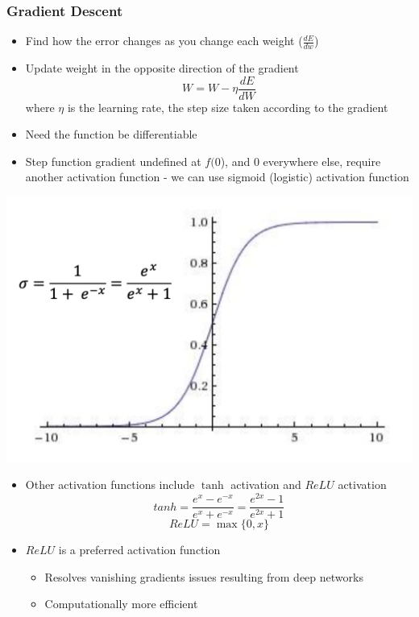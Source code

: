 \documentclass[11pt]{article}
\begin{document}
\subsubsection{Gradient Descent }
\begin{itemize}
\item Find how the error changes as you change each weight ($\frac{dE}{dw}$)
\item Update weight in the opposite direction of the gradient 
$$ W = W - \eta \frac{dE}{dW}$$ 
where $\eta$ is the learning rate,  the step size taken according to the gradient 
\item Need the function be differentiable
\item Step function gradient undefined at $f(0$), and $0$ everywhere else,  require another activation function - we can use sigmoid (logistic) activation function 
\end{itemize}
\begin{center}
\includegraphics[scale=0.35]{images/sigmoid.png}
\end{center}
\begin{itemize}
\item Other activation functions include $\tanh$ activation and $ReLU$ activation
$$ tanh = \frac{e^x - e^{-x}}{e^x + e^{-x}} = \frac{e^{2x} -  1}{e^{2x} + 1} $$ 
$$ ReLU = \max \{ 0,  x \} $$ 
\item $ReLU$ is a preferred activation function
\begin{itemize}
\item Resolves vanishing gradients issues resulting from deep networks
\item Computationally more efficient
\end{itemize}
\end{itemize}
\end{document}
